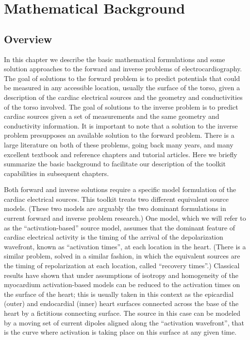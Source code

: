 \chapter{Mathematical Background} \label{sec:ch1}

\section{Overview}

In this chapter we describe the basic mathematical formulations and some
solution approaches to the forward and inverse problems of
electrocardiography. The goal of solutions to the forward problem is to
predict potentials that could be measured in any accessible location,
usually the surface of the torso, given a description of the cardiac
electrical sources and the geometry and conductivities of the torso involved. The goal of
solutions to the inverse problem is to predict cardiac sources given a set
of measurements and the same geometry and conductivity information. It is
important to note that a solution to the inverse problem presupposes an
available solution to the forward problem. There is a large literature on
both of these problems, going back many years, and many excellent textbook
and reference chapters and tutorial articles. Here we briefly summarize the
basic background to facilitate our description of the toolkit capabilities
in subsequent chapters.

Both forward and inverse solutions require a specific model formulation of
the cardiac electrical sources. This toolkit treats two different
equivalent source models. (These two models are arguably the two dominant
formulations in current forward and inverse problem research.) One model,
which we will refer to as the ``activation-based'' source model, assumes
that the dominant feature of cardiac electrical activity is the timing of
the arrival of the depolarization wavefront, known as ``activation times'',
at each location in the heart. (There is a similar problem, solved in a
similar fashion, in which the equivalent sources are the timing of
repolarization at each location, called ``recovery times''.)  Classical
results have shown that under assumptions of isotropy and homogeneity of
the myocardium activation-based models can be reduced to the activation
times on the surface of the heart; this is usually taken in this context as
the epicardial (outer) and endocardial (inner) heart surfaces connected
across the base of the heart by a fictitious connecting surface. The source
in this case can be modeled by a moving set of current dipoles aligned
along the ``activation wavefront'', that is the curve where activation is
taking place on this surface at any given time.

